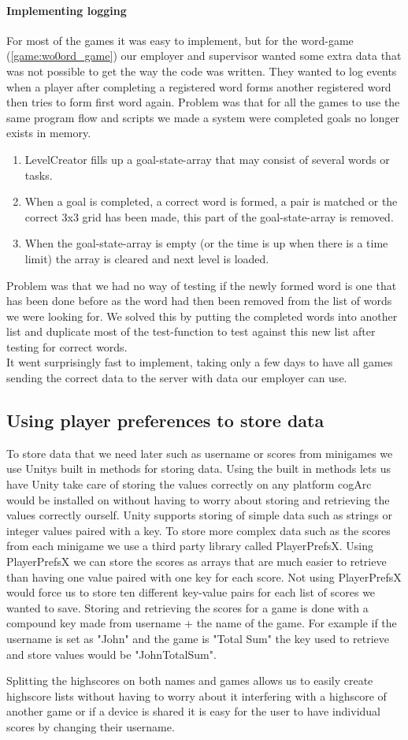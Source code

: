\paragraph{Implementing logging}
For most of the games it was easy to implement, but for the word-game (\ref{game:wo0ord_game}) our employer and supervisor wanted some extra data that was not possible to get the way the code was written. 
They wanted to log events when a player after completing a registered word forms another registered word  then tries to form first word again. 
Problem was that for all the games to use the same program flow and scripts we made a system were completed goals no longer exists in memory. 
\begin{enumerate}
	\item LevelCreator fills up a goal-state-array that may consist of several words or tasks.
	\item When a goal is completed, a correct word is formed, a pair is matched or the correct 3x3 grid has been made, this part of the goal-state-array is removed.
	\item When the goal-state-array is empty (or the time is up when there is a time limit) the array is cleared and next level is loaded.
\end{enumerate}
Problem was that we had no way of testing if the newly formed word is one that has been done before as the word had then been removed from the list of words we were looking for. 
We solved this by putting the completed words into another list and duplicate most of the test-function to test against this new list after testing for correct words.\\ 
It went surprisingly fast to implement, taking only a few days to have all games sending the correct data to the server with data our employer can use.


\subsection{Using player preferences to store data}
To store data that we need later such as username or scores from minigames we use Unitys built in methods for storing data.
Using the built in methods lets us have Unity take care of storing the values correctly on any platform cogArc would be installed on without having to worry about 
storing and retrieving the values correctly ourself.
Unity supports storing of simple data such as strings or integer values paired with a key.
To store more complex data such as the scores from each minigame we use a third party library called PlayerPrefsX\cite{PlayerPrefsX}.
Using PlayerPrefsX we can store the scores as arrays that are much easier to retrieve than having one value paired with one key for each score.
Not using PlayerPrefsX would force us to store ten different key-value pairs for each list of scores we wanted to save.
Storing and retrieving the scores for a game is done with a compound key made from username + the name of the game.
For example if the username is set as "John" and the game is "Total Sum" the key used to retrieve and store values would be "JohnTotalSum".

Splitting the highscores on both names and games allows us to easily create highscore lists without having to worry about it interfering with
a highscore of another game or if a device is shared it is easy for the user to have individual scores by changing their username.
